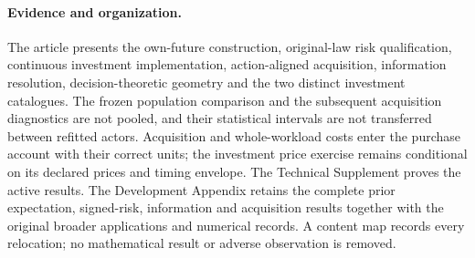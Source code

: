 \paragraph{Evidence and organization.}
The article presents the own-future construction, original-law risk qualification, continuous investment implementation, action-aligned acquisition, information resolution, decision-theoretic geometry and the two distinct investment catalogues. The frozen population comparison and the subsequent acquisition diagnostics are not pooled, and their statistical intervals are not transferred between refitted actors. Acquisition and whole-workload costs enter the purchase account with their correct units; the investment price exercise remains conditional on its declared prices and timing envelope. The Technical Supplement proves the active results. The Development Appendix retains the complete prior expectation, signed-risk, information and acquisition results together with the original broader applications and numerical records. A content map records every relocation; no mathematical result or adverse observation is removed.
